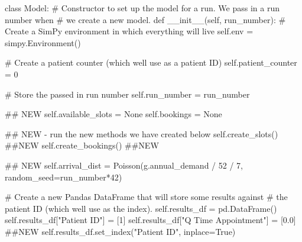 \documentclass[
  letterpaper,
  DIV=11,
  numbers=noendperiod]{scrreprt}
\newenvironment{Shaded}{\begin{snugshade}}{\end{snugshade}}
\newcommand{\CommentTok}[1]{\textcolor[rgb]{0.37,0.37,0.37}{#1}}
\newcommand{\DecValTok}[1]{\textcolor[rgb]{0.68,0.00,0.00}{#1}}
\newcommand{\FloatTok}[1]{\textcolor[rgb]{0.68,0.00,0.00}{#1}}
\newcommand{\FunctionTok}[1]{\textcolor[rgb]{0.28,0.35,0.67}{#1}}
\newcommand{\KeywordTok}[1]{\textcolor[rgb]{0.00,0.23,0.31}{#1}}
\newcommand{\NormalTok}[1]{\textcolor[rgb]{0.00,0.23,0.31}{#1}}
\newcommand{\OperatorTok}[1]{\textcolor[rgb]{0.37,0.37,0.37}{#1}}
\newcommand{\StringTok}[1]{\textcolor[rgb]{0.13,0.47,0.30}{#1}}
\newcommand{\VariableTok}[1]{\textcolor[rgb]{0.07,0.07,0.07}{#1}}
\newcommand*\circled[1]{\tikz[baseline=(char.base)]{
          \node[shape=circle,draw,inner sep=1pt] (char) {{\scriptsize#1}};}}
\begin{document}
\label{annotated-cell-158}%
\begin{Shaded}
\begin{Highlighting}[]
\KeywordTok{class}\NormalTok{ Model:}
    \CommentTok{\# Constructor to set up the model for a run.  We pass in a run number when}
    \CommentTok{\# we create a new model.}
    \KeywordTok{def} \FunctionTok{\_\_init\_\_}\NormalTok{(}\VariableTok{self}\NormalTok{, run\_number):}
        \CommentTok{\# Create a SimPy environment in which everything will live}
        \VariableTok{self}\NormalTok{.env }\OperatorTok{=}\NormalTok{ simpy.Environment()}

        \CommentTok{\# Create a patient counter (which we\textquotesingle{}ll use as a patient ID)}
        \VariableTok{self}\NormalTok{.patient\_counter }\OperatorTok{=} \DecValTok{0}

        \CommentTok{\# Store the passed in run number}
        \VariableTok{self}\NormalTok{.run\_number }\OperatorTok{=}\NormalTok{ run\_number}

        \CommentTok{\#\# NEW}
        \VariableTok{self}\NormalTok{.available\_slots }\OperatorTok{=} \VariableTok{None}
        \VariableTok{self}\NormalTok{.bookings }\OperatorTok{=} \VariableTok{None}

        \CommentTok{\#\# NEW {-} run the new methods we have created below}
        \VariableTok{self}\NormalTok{.create\_slots() }\CommentTok{\#\#NEW}
        \VariableTok{self}\NormalTok{.create\_bookings() }\CommentTok{\#\#NEW}

        \CommentTok{\#\# NEW}
        \VariableTok{self}\NormalTok{.arrival\_dist }\OperatorTok{=}\NormalTok{ Poisson(g.annual\_demand }\OperatorTok{/} \DecValTok{52} \OperatorTok{/} \DecValTok{7}\NormalTok{, }\hspace*{\fill}\NormalTok{\circled{1}}
\NormalTok{                                    random\_seed}\OperatorTok{=}\NormalTok{run\_number}\OperatorTok{*}\DecValTok{42}\NormalTok{) }\hspace*{\fill}\NormalTok{\circled{2}}

        \CommentTok{\# Create a new Pandas DataFrame that will store some results against}
        \CommentTok{\# the patient ID (which we\textquotesingle{}ll use as the index).}
        \VariableTok{self}\NormalTok{.results\_df }\OperatorTok{=}\NormalTok{ pd.DataFrame()}
        \VariableTok{self}\NormalTok{.results\_df[}\StringTok{"Patient ID"}\NormalTok{] }\OperatorTok{=}\NormalTok{ [}\DecValTok{1}\NormalTok{]}
        \VariableTok{self}\NormalTok{.results\_df[}\StringTok{"Q Time Appointment"}\NormalTok{] }\OperatorTok{=}\NormalTok{ [}\FloatTok{0.0}\NormalTok{] }\CommentTok{\#\#NEW}
        \VariableTok{self}\NormalTok{.results\_df.set\_index(}\StringTok{"Patient ID"}\NormalTok{, inplace}\OperatorTok{=}\VariableTok{True}\NormalTok{)}


\end{Highlighting}
\end{Shaded}
\end{document}
